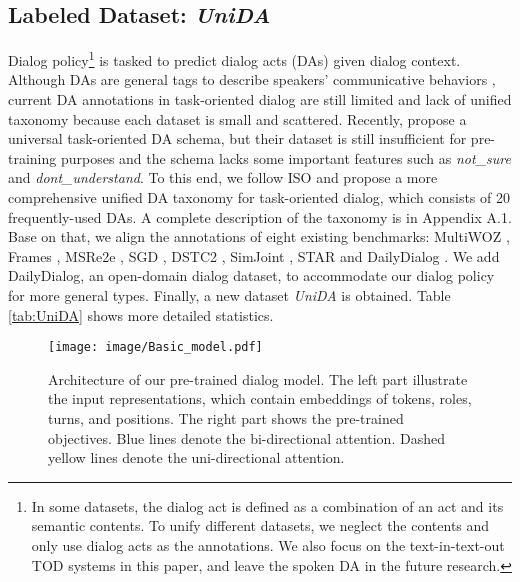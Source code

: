 \documentclass[letterpaper]{article} \usepackage{aaai22}  \usepackage{times}  \usepackage{helvet}  \usepackage{courier}  \usepackage[hyphens]{url}  \usepackage{graphicx} \urlstyle{rm} \def\UrlFont{\rm}  \usepackage{natbib}  \usepackage{caption} \DeclareCaptionStyle{ruled}{labelfont=normalfont,labelsep=colon,strut=off} \frenchspacing  \setlength{\pdfpagewidth}{8.5in}  \setlength{\pdfpageheight}{11in}  \usepackage{algorithm}
\begin{document}
\subsection{Labeled Dataset: \textit{UniDA}}
Dialog policy\footnote{In some datasets, the dialog act is defined as a combination of an act  and its semantic contents. To unify different datasets, we neglect the contents and only use dialog acts as the annotations. We also focus on the text-in-text-out TOD systems in this paper, and leave the spoken DA in the future research.} 
is tasked to predict dialog acts (DAs) given dialog context. Although DAs are general tags to describe speakers'  communicative behaviors \cite{bunt2009dit},  current DA annotations in task-oriented dialog are still limited and lack of unified taxonomy because each dataset is small and scattered. Recently, \citet{paul2019towards} propose a universal task-oriented DA schema, but their dataset is still insufficient for pre-training purposes and the schema lacks some important features such as \textit{not\_sure} and \textit{dont\_understand}. To this end, we follow ISO \cite{bunt2010towards} and propose a more comprehensive unified DA taxonomy for task-oriented dialog, which consists of 20 frequently-used DAs. A complete description of the taxonomy is in Appendix A.1. Base on that, we align the annotations of eight existing benchmarks: MultiWOZ
\cite{budzianowski2018multiwoz}, Frames \cite{asri2017frames}, MSRe2e \cite{li2018microsoft}, SGD \cite{rastogi2020towards}, DSTC2 \cite{henderson2014second}, SimJoint \cite{shah2018bootstrapping}, STAR
\cite{mosig2020star} and DailyDialog \cite{li2017dailydialog}. We add DailyDialog, an open-domain dialog dataset, to accommodate our dialog policy for more general types. Finally, a new dataset \textit{UniDA} is obtained. 
Table \ref{tab:UniDA} shows more detailed statistics.


\begin{figure*}[htp]
    \centering
    \texttt{[image: image/Basic\_model.pdf]}
    \caption{Architecture of our pre-trained dialog model. The left part illustrate the input representations, which contain embeddings of tokens, roles, turns, and positions. The right part shows the pre-trained objectives.
    Blue lines denote the bi-directional attention. Dashed yellow lines denote the uni-directional attention.}
\label{fig:basicmodel}
\end{figure*}
\end{document}
